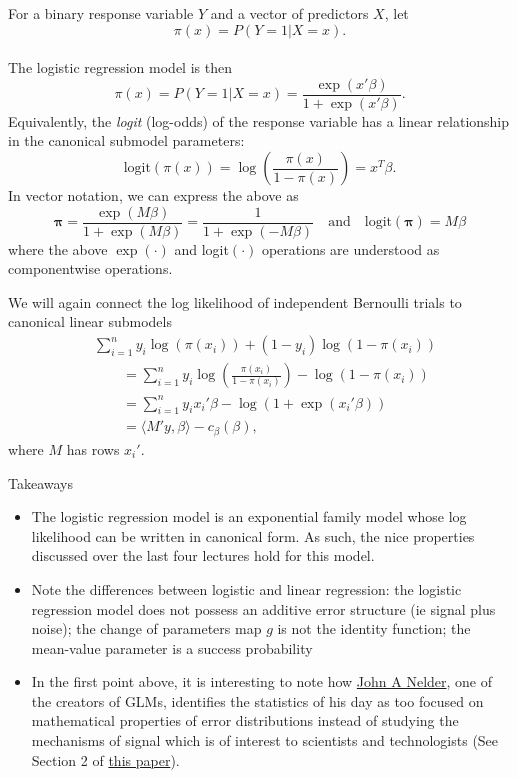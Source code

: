 \documentclass[
  ignorenonframetext,
]{beamer}
\providecommand{\tightlist}{%
  \setlength{\itemsep}{0pt}\setlength{\parskip}{0pt}}
\begin{document}
\begin{frame}{}
\protect\hypertarget{section-1}{}
For a binary response variable \(Y\) and a vector of predictors \(X\),
let \[
  \pi(x) = P(Y = 1|X = x). 
\]\\
The logistic regression model is then \begin{equation} \label{logit}
  \pi(x) = P(Y = 1|X = x) = \frac{\exp(x'\beta)}{1 + \exp(x'\beta)}.
\end{equation} Equivalently, the \emph{logit} (log-odds) of the response
variable has a linear relationship in the canonical submodel parameters:
\[
  \text{logit}(\pi(x)) = \log\left(\frac{\pi(x)}{1 - \pi(x)}\right) =  x^T\beta.
\] In vector notation, we can express the above as \[
  \bm{\pi}= \frac{\exp(M\beta)}{1 + \exp(M\beta)} = \frac{1}{1 + \exp(-M\beta)} \quad \text{and} \quad 
    \text{logit}(\bm{\pi}) = M\beta
\] where the above \(\exp(\cdot)\) and logit\((\cdot)\) operations are
understood as componentwise operations.
\end{frame}

\begin{frame}{}
\protect\hypertarget{section-2}{}
We will again connect the log likelihood of independent Bernoulli trials
to canonical linear submodels \begin{align*}
  &\sum_{i=1}^n y_i\log(\pi(x_i)) + (1-y_i)\log(1 - \pi(x_i)) \\
    &\qquad= \sum_{i=1}^n y_i\log\left(\frac{\pi(x_i)}{1 - \pi(x_i)}\right) - \log(1 - \pi(x_i)) \\
    &\qquad= \sum_{i=1}^n y_ix_i'\beta - \log(1 + \exp(x_i'\beta)) \\
    &\qquad= \langle M'y, \beta \rangle - c_\beta(\beta), 
\end{align*} where \(M\) has rows \(x_i'\).
\end{frame}

\begin{frame}{Takeaways}
\protect\hypertarget{takeaways}{}
\begin{itemize}
\tightlist
\item
  The logistic regression model is an exponential family model whose log
  likelihood can be written in canonical form. As such, the nice
  properties discussed over the last four lectures hold for this model.
\item
  Note the differences between logistic and linear regression: the
  logistic regression model does not possess an additive error structure
  (ie signal plus noise); the change of parameters map \(g\) is not the
  identity function; the mean-value parameter is a success probability
\item
  In the first point above, it is interesting to note how
  \href{https://en.wikipedia.org/wiki/John_Nelder}{John A Nelder}, one
  of the creators of GLMs, identifies the statistics of his day as too
  focused on mathematical properties of error distributions instead of
  studying the mechanisms of signal which is of interest to scientists
  and technologists (See Section 2 of
  \href{https://rss.onlinelibrary.wiley.com/doi/abs/10.2307/2981525}{this
  paper}).
\end{itemize}
\end{frame}
\end{document}
